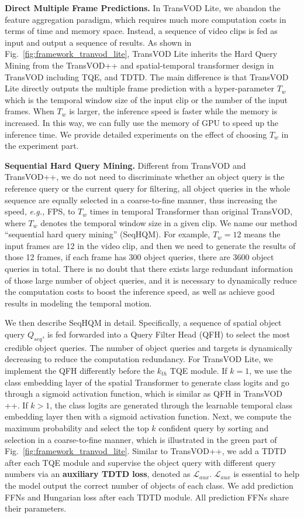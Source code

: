 \documentclass[10pt,journal,compsoc]{IEEEtran}
\begin{document}
\noindent
\textbf{Direct Multiple Frame Predictions.} In TransVOD Lite, we abandon the feature aggregation paradigm, which requires much more computation costs in terms of time and memory space. Instead, a sequence of video clips is fed as input and output a sequence of results. 
As shown in Fig.~\ref{fig:framework_tranvod_lite}, TransVOD Lite inherits the Hard Query Mining from the TransVOD++ and spatial-temporal transformer design in TransVOD including TQE, and TDTD. The main difference is that TransVOD Lite directly outputs the multiple frame prediction with a hyper-parameter $T_w$ which is the temporal window size of the input clip or the number of the input frames. When $T_w$ is larger, the inference speed is faster while the memory is increased. In this way, we can fully use the memory of GPU to speed up the inference time. We provide detailed experiments on the effect of choosing $T_w$ in the experiment part.

\noindent
\textbf{Sequential Hard Query Mining.} 
Different from TransVOD and TransVOD++, we do not need to discriminate whether an object query is the reference query or the current query for filtering, all object queries in the whole sequence are equally selected in a coarse-to-fine manner, thus increasing the speed, \emph{e.g.,} FPS, to $T_w$ times in temporal Transformer than original TransVOD, where $T_w$ denotes the temporal window size in a given clip.
We name our method ``sequential hard query mining'' (SeqHQM).
For example, $T_w=12$ means the input frames are 12 in the video clip, and then we need to generate the results of those 12 frames, if each frame has 300 object queries, there are 3600 object queries in total. There is no doubt that there exists large redundant information of those large number of object queries, and it is necessary to dynamically reduce the computation costs to boost the inference speed, as well as achieve good results in modeling the temporal motion.

We then describe SeqHQM in detail. Specifically, a sequence of spatial object query $Q_{seq}$, is fed forwarded into a Query Filter Head (QFH) to select the most credible object queries. The number of object queries and targets is dynamically decreasing to reduce the computation redundancy. For TransVOD Lite, we implement the QFH differently before the $k_{th}$ TQE module. If $k=1$, we use the class embedding layer of the spatial Transformer to generate class logits and go through a sigmoid activation function, which is similar as QFH in TransVOD ++. If $k>1$, the class logits are generated through the learnable temporal class embedding layer then with a sigmoid activation function. Next, we compute the maximum probability and select the top $k$ confident query by sorting and selection in a coarse-to-fine manner, which is illustrated in the green part of Fig.~\ref{fig:framework_tranvod_lite}.
Similar to TransVOD++, we add a TDTD after each TQE module and supervise the object query with different query numbers via an \textbf{auxiliary TDTD loss}, denoted as $\mathcal{L}_{aux}$.  $\mathcal{L}_{aux}$ is essential to help the model output the correct number of objects of each class. We add prediction FFNs and Hungarian loss after each TDTD module. All prediction FFNs share their parameters. 
\end{document}
